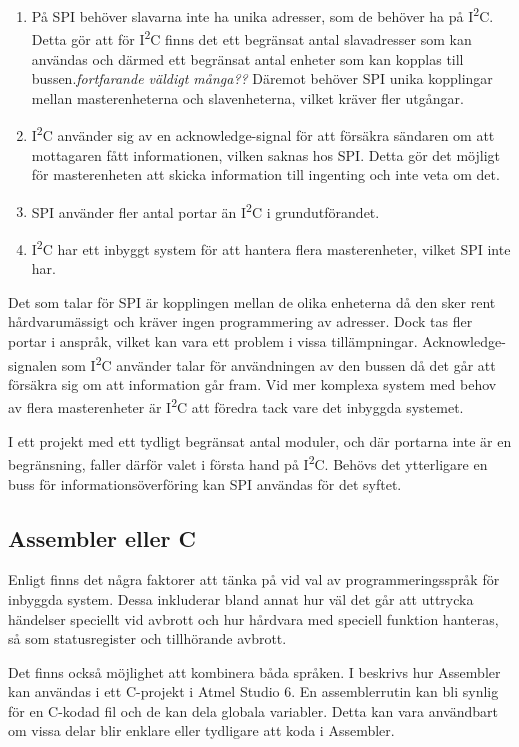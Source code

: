 \documentclass[11pt]{article}
\begin{document}
\begin{flushleft}
\begin{enumerate}
	\item På SPI behöver slavarna inte ha unika adresser, som de behöver ha på I\textsuperscript{2}C. Detta gör att för I\textsuperscript{2}C finns det ett begränsat antal slavadresser som kan användas och därmed ett begränsat antal enheter som kan kopplas till bussen.\textit{fortfarande väldigt många??} Däremot behöver SPI unika kopplingar mellan masterenheterna och slavenheterna, vilket kräver fler utgångar.
	\item I\textsuperscript{2}C använder sig av en acknowledge-signal för att försäkra sändaren om att mottagaren fått informationen, vilken saknas hos SPI. Detta gör det möjligt för masterenheten att skicka information till ingenting och inte veta om det. 
	\item SPI använder fler antal portar än I\textsuperscript{2}C i grundutförandet.
	\item I\textsuperscript{2}C har ett inbyggt system för att hantera flera masterenheter, vilket SPI inte har.
\end{enumerate}

Det som talar för SPI är kopplingen mellan de olika enheterna då den sker rent hårdvarumässigt och kräver ingen programmering av adresser. Dock tas fler portar i anspråk, vilket kan vara ett problem i vissa tillämpningar. Acknowledge-signalen som I\textsuperscript{2}C använder talar för användningen av den bussen då det går att försäkra sig om att information går fram. Vid mer komplexa system med behov av flera masterenheter är I\textsuperscript{2}C att föredra tack vare det inbyggda systemet. 

I ett projekt med ett tydligt begränsat antal moduler, och där portarna inte är en begränsning, faller därför valet i första hand på I\textsuperscript{2}C. Behövs det ytterligare en buss för informationsöverföring kan SPI användas för det syftet.

\subsection{Assembler eller C}

Enligt \cite{CPC} finns det några faktorer att tänka på vid val av programmeringsspråk för inbyggda system. Dessa inkluderar bland annat hur väl det går att uttrycka händelser speciellt vid avbrott och hur hårdvara med speciell funktion hanteras, så som statusregister och tillhörande avbrott.  

Det finns också möjlighet att kombinera båda språken. I \cite{AssC} beskrivs hur Assembler kan användas i ett C-projekt i Atmel Studio 6. En assemblerrutin kan bli synlig för en C-kodad fil och de kan dela globala variabler. Detta kan vara användbart om vissa delar blir enklare eller tydligare att koda i Assembler.


\end{flushleft}
\end{document}
